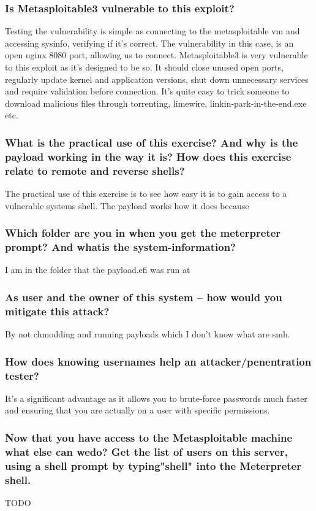 \subsubsection{Is Metasploitable3 vulnerable to this exploit?}
Testing the vulnerability is simple as connecting to the metasploitable vm and accessing sysinfo, verifying if it's correct.
The vulnerability in this case, is an open nginx 8080 port, allowing us to connect.
Metasploitable3 is very vulnerable to this exploit as it's designed to be so.
It should close unused open ports, regularly update kernel and application versions, shut down unnecessary services and require validation before connection.
It's quite easy to trick someone to download malicious files through torrenting, limewire, linkin-park-in-the-end.exe etc.

\subsubsection{What is the practical use of this exercise? And why is the payload working in the way it is? How does this exercise relate to remote and reverse shells?}
The practical use of this exercise is to see how easy it is to gain access to a vulnerable systems shell. The payload works how it does because

\subsubsection{Which folder are you in when you get the meterpreter prompt? And whatis the system-information?}
I am in the folder that the payload.efi was run at

\subsubsection{As user and the owner of this system -- how would you mitigate this attack?}
By not chmodding and running payloads which I don't know what are smh.

\subsubsection{How does knowing usernames help an attacker/penentration tester?
}
It's a significant advantage as it allows you to brute-force passwords much faster and ensuring that you are actually on a user with specific permissions.

\subsubsection{Now that you have access to the Metasploitable machine what else can wedo? Get the list of users on this server, using a shell prompt by typing"shell" into the Meterpreter shell.}
TODO

